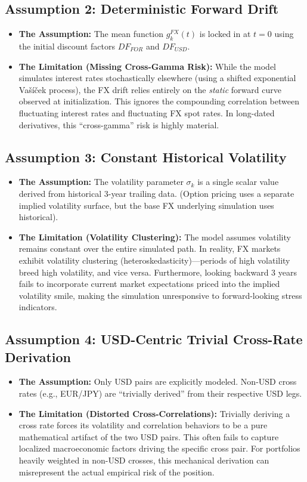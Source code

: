 \subsection*{Assumption 2: Deterministic Forward Drift}
\begin{itemize}
	\item \textbf{The Assumption:} The mean function $g_k^{FX}(t)$ is locked in at $t=0$ using the initial discount factors $DF_{FOR}$ and $DF_{USD}$.
	\item \textbf{The Limitation (Missing Cross-Gamma Risk):} While the model simulates interest rates stochastically elsewhere (using a shifted exponential Va\v{s}\'{i}\v{c}ek process), the FX drift relies entirely on the \textit{static} forward curve observed at initialization. This ignores the compounding correlation between fluctuating interest rates and fluctuating FX spot rates. In long-dated derivatives, this ``cross-gamma'' risk is highly material.
\end{itemize}

\subsection*{Assumption 3: Constant Historical Volatility}
\begin{itemize}
	\item \textbf{The Assumption:} The volatility parameter $\sigma_k$ is a single scalar value derived from historical 3-year trailing data. (Option pricing uses a separate implied volatility surface, but the base FX underlying simulation uses historical).
	\item \textbf{The Limitation (Volatility Clustering):} The model assumes volatility remains constant over the entire simulated path. In reality, FX markets exhibit volatility clustering (heteroskedasticity)—periods of high volatility breed high volatility, and vice versa. Furthermore, looking backward 3 years fails to incorporate current market expectations priced into the implied volatility smile, making the simulation unresponsive to forward-looking stress indicators.
\end{itemize}

\subsection*{Assumption 4: USD-Centric Trivial Cross-Rate Derivation}
\begin{itemize}
	\item \textbf{The Assumption:} Only USD pairs are explicitly modeled. Non-USD cross rates (e.g., EUR/JPY) are ``trivially derived'' from their respective USD legs.
	\item \textbf{The Limitation (Distorted Cross-Correlations):} Trivially deriving a cross rate forces its volatility and correlation behaviors to be a pure mathematical artifact of the two USD pairs. This often fails to capture localized macroeconomic factors driving the specific cross pair. For portfolios heavily weighted in non-USD crosses, this mechanical derivation can misrepresent the actual empirical risk of the position.
\end{itemize}

